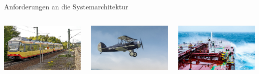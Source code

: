 {\begin{frame}{Anforderungen an die Systemarchitektur}
    \begin{columns}[onlytextwidth]
        \includegraphics[width=\textwidth]{06-architektur/img/anforderungen4}

        \includegraphics[width=\textwidth]{06-architektur/img/anforderungen5}

        \includegraphics[width=\textwidth]{06-architektur/img/anforderungen6}
    \end{columns}
\end{frame}
}

